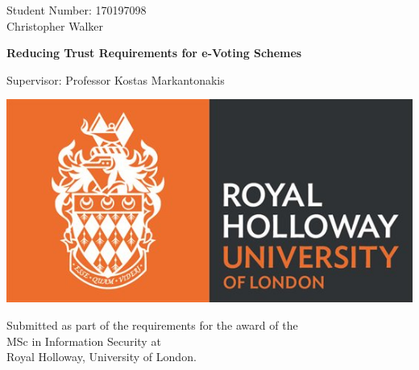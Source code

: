

\hypersetup{pageanchor=false} %
\begin{titlepage}

    \begin{center}
        {\large Student Number: 170197098 \\ Christopher Walker}

        \vspace*{1em}

        {\Huge\bfseries Reducing Trust Requirements for e-Voting Schemes}

        \vspace*{1em}

        {\large Supervisor:  Professor Kostas Markantonakis}

        \vspace*{1em}

        \includegraphics[scale=0.5]{lib/rhuol_logo.jpg}

        \vspace*{2em}

        \large Submitted as part of the requirements for the award of the \\
        MSc in Information Security at \\
        Royal Holloway, University of London.

    \end{center}

    \vspace*{\fill}

\end{titlepage}

\hypersetup{pageanchor=true} %